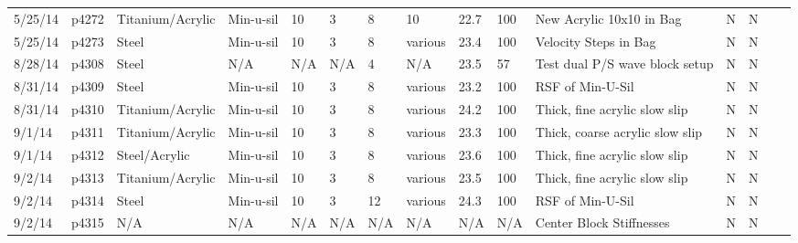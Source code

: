 \begin{landscape}
\begin{longtable}{lllllllllllllll}
5/25/14  & p4272      & Titanium/Acrylic & Min-u-sil    & 10           & 3         & 8             & 10                           & 22.7        & 100      & New Acrylic 10x10 in Bag                        & N     & N    &  &  \\
5/25/14  & p4273      & Steel            & Min-u-sil    & 10           & 3         & 8             & various                      & 23.4        & 100      & Velocity Steps in Bag                           & N     & N    &  &  \\
8/28/14  & p4308      & Steel            & N/A          & N/A          & N/A       & 4             & N/A                          & 23.5        & 57       & Test dual P/S wave block setup                  & N     & N    &  &  \\
8/31/14  & p4309      & Steel            & Min-u-sil    & 10           & 3         & 8             & various                      & 23.2        & 100      & RSF of Min-U-Sil                                & N     & N    &  &  \\
8/31/14  & p4310      & Titanium/Acrylic & Min-u-sil    & 10           & 3         & 8             & various                      & 24.2        & 100      & Thick, fine acrylic slow slip                   & N     & N    &  &  \\
9/1/14   & p4311      & Titanium/Acrylic & Min-u-sil    & 10           & 3         & 8             & various                      & 23.3        & 100      & Thick, coarse acrylic slow slip                 & N     & N    &  &  \\
9/1/14   & p4312      & Steel/Acrylic    & Min-u-sil    & 10           & 3         & 8             & various                      & 23.6        & 100      & Thick, fine acrylic slow slip                   & N     & N    &  &  \\
9/2/14   & p4313      & Titanium/Acrylic & Min-u-sil    & 10           & 3         & 8             & various                      & 23.5        & 100      & Thick, fine acrylic slow slip                   & N     & N    &  &  \\
9/2/14   & p4314      & Steel            & Min-u-sil    & 10           & 3         & 12            & various                      & 24.3        & 100      & RSF of Min-U-Sil                                & N     & N    &  &  \\
9/2/14   & p4315      & N/A              & N/A          & N/A          & N/A       & N/A           & N/A                          & N/A         & N/A      & Center Block Stiffnesses                        & N     & N    &  &  \\

\end{longtable}
\end{landscape}
